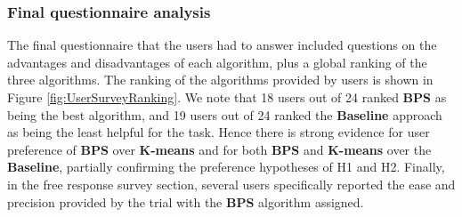 \subsubsection{Final questionnaire analysis}
The final questionnaire that the users had to answer included questions on the advantages and disadvantages of each algorithm, plus a global ranking of the three algorithms. %
%
%
%
The ranking of the algorithms provided by users is shown in Figure \ref{fig:UserSurveyRanking}. 
We note that 18 users out of 24 ranked {\bf BPS} as being the best algorithm, and 19 users out of 24 ranked the {\bf Baseline} approach as being the least helpful for the task.  Hence there is strong evidence for user preference of {\bf BPS} over {\bf $\mathbf{K}$-means} and for both {\bf BPS} and {\bf $\mathbf{K}$-means} over the {\bf Baseline}, partially confirming the preference hypotheses of H1 and H2.  
Finally, in the free response survey section, several users specifically reported the %
ease and precision provided by the trial with the {\bf BPS} algorithm  assigned.%

















